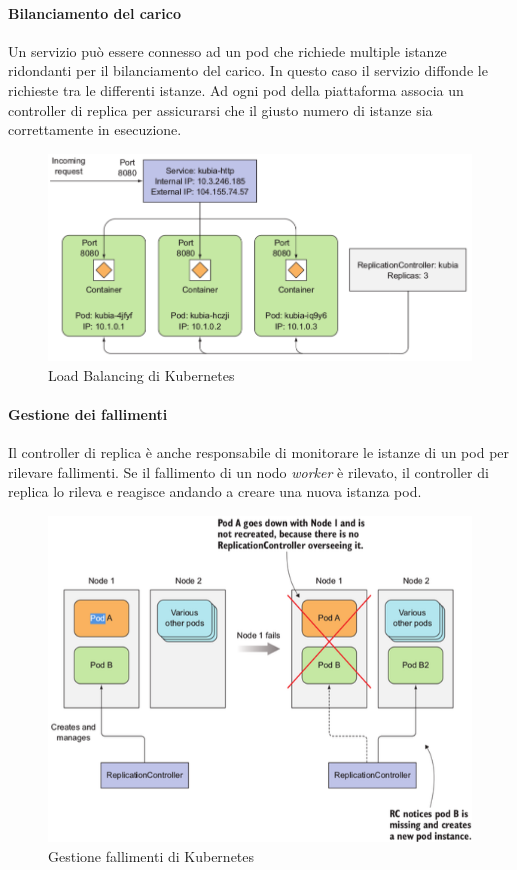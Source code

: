 \documentclass{article}
\begin{document}
\paragraph{Bilanciamento del carico}
Un servizio può essere connesso ad un pod che richiede multiple istanze ridondanti per il bilanciamento del carico. In questo caso il servizio diffonde le richieste tra le differenti istanze. Ad ogni pod della piattaforma associa un controller di replica per assicurarsi che il giusto numero di istanze sia correttamente in esecuzione.
\begin{figure}[H]
    \centering
    \includegraphics[scale=0.3]{img/kubernetes load balancing.png}
    \caption{Load Balancing di Kubernetes}
\end{figure}\noindent

\paragraph{Gestione dei fallimenti}
Il controller di replica è anche responsabile di monitorare le istanze di un pod per rilevare fallimenti. Se il fallimento di un nodo \textit{worker} è rilevato, il controller di replica lo rileva e reagisce andando a creare una nuova istanza pod.
\begin{figure}[H]
    \centering
    \includegraphics[scale=0.4]{img/kubernetes gestione fallimenti.png}
    \caption{Gestione fallimenti di Kubernetes}
\end{figure}\noindent
\end{document}
